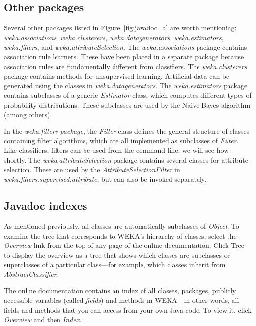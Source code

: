 \subsection{Other packages}

Several other packages listed in Figure~\ref{fig:javadoc_a} are worth mentioning:
\textit{weka.associations}, \textit{weka.clusterers}, \textit{weka.datagenerators},
\textit{weka.estimators}, \textit{weka.filters}, and \newline
\textit{weka.attributeSelection}. The
\textit{weka.associations} package contains association rule learners. These
have been placed in a separate package because association rules are
fundamentally different from classifiers. The \textit{weka.clusterers} package
contains methods for unsupervised learning. Artificial data can be
generated using the classes in \textit{weka.datagenerators}. The
\textit{weka.estimators} package contains subclasses of a generic \textit{Estimator}
class, which computes different types of probability
distributions. These subclasses are used by the Naive Bayes algorithm
(among others).

In the \textit{weka.filters package}, the \textit{Filter} class
defines the general structure of classes containing filter algorithms,
which are all implemented as subclasses of \textit{Filter}. Like classifiers,
filters can be used from the command line: we will see how
shortly. The \textit{weka.attributeSelection} package contains several classes
for attribute selection. These are used by the
\textit{AttributeSelectionFilter} in \newline
\textit{weka.filters.supervised.attribute}, but can also be invoked separately.

\subsection{Javadoc indexes}

As mentioned previously, all classes are automatically subclasses of
\textit{Object}. To examine the tree that corresponds to WEKA's hierarchy of
classes, select the \textit{Overview} link from the top of any page of
the online documentation. Click Tree to display the overview as a tree
that shows which classes are subclasses or superclasses of a
particular class---for example, which classes inherit from
\textit{AbstractClassifier}.

The online documentation contains an index of all classes, packages,
publicly accessible variables (called \textit{fields}) and methods in
WEKA---in other words, all fields and methods that you can access from
your own Java code. To view it, click \textit{Overview} and
then \textit{Index}.

